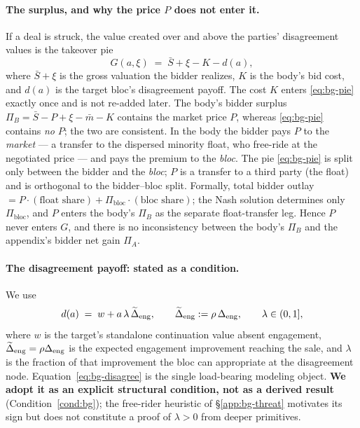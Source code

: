 \paragraph{The surplus, and why the price $P$ does not enter it.}
If a deal is struck, the value created over and above the parties' disagreement
values is the takeover pie
\begin{equation}
  \label{eq:bg-pie}
  G(a,\xi)\;=\;\bar S+\xi-K-d(a),
\end{equation}
where $\bar S+\xi$ is the gross valuation the bidder realizes, $K$ is the body's
bid cost, and $d(a)$ is the target bloc's disagreement payoff. The cost $K$
enters \eqref{eq:bg-pie} exactly once and is not re-added later. The body's
bidder surplus $\Pi_{B}=\bar S-P+\xi-\bar m-K$ contains the market price $P$,
whereas \eqref{eq:bg-pie} contains \emph{no} $P$; the two are consistent. In the
body the bidder pays $P$ to the \emph{market} --- a transfer to the dispersed
minority float, who free-ride at the negotiated price --- and pays the premium to
the \emph{bloc}. The pie \eqref{eq:bg-pie} is split only between the bidder and
the \emph{bloc}; $P$ is a transfer to a third party (the float) and is orthogonal
to the bidder--bloc split. Formally, total bidder outlay
$=P\cdot(\text{float share})+\Pi_{\text{bloc}}\cdot(\text{bloc share})$; the Nash
solution determines only $\Pi_{\text{bloc}}$, and $P$ enters the body's $\Pi_{B}$
as the separate float-transfer leg. Hence $P$ never enters $G$, and there is no
inconsistency between the body's $\Pi_{B}$ and the appendix's bidder net gain
$\Pi_{A}$.

\paragraph{The disagreement payoff: stated as a condition.}
We use
\begin{equation}
  \label{eq:bg-disagree}
  d(a)\;=\;w+a\,\lambda\,\widetilde{\Delta}_{\mathrm{eng}},
  \qquad \widetilde{\Delta}_{\mathrm{eng}}:=\rho\,\Delta_{\mathrm{eng}},
  \qquad \lambda\in(0,1],
\end{equation}
where $w$ is the target's standalone continuation value absent engagement,
$\widetilde{\Delta}_{\mathrm{eng}}=\rho\Delta_{\mathrm{eng}}$ is the expected engagement
improvement reaching the sale, and $\lambda$ is the fraction of that improvement
the bloc can appropriate at the disagreement node. Equation~\eqref{eq:bg-disagree}
is the single load-bearing modeling object. \textbf{We adopt it as an explicit
structural condition, not as a derived result} (Condition~\ref{cond:bg}); the
free-rider heuristic of \S\ref{app:bg-threat} motivates its sign but does not
constitute a proof of $\lambda>0$ from deeper primitives.

